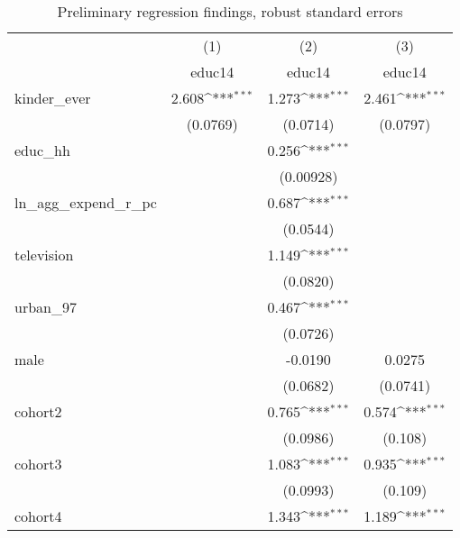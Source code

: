 \begin{table}[htbp]\centering
\def\sym#1{\ifmmode^{#1}\else\(^{#1}\)\fi}
\caption{Preliminary regression findings, robust standard errors}
\begin{tabular}{l*{3}{c}}
\hline\hline
            &\multicolumn{1}{c}{(1)}&\multicolumn{1}{c}{(2)}&\multicolumn{1}{c}{(3)}\\
            &\multicolumn{1}{c}{educ14}&\multicolumn{1}{c}{educ14}&\multicolumn{1}{c}{educ14}\\
\hline
kinder\_ever &       2.608\sym{***}&       1.273\sym{***}&       2.461\sym{***}\\
            &    (0.0769)         &    (0.0714)         &    (0.0797)         \\
[1em]
educ\_hh     &                     &       0.256\sym{***}&                     \\
            &                     &   (0.00928)         &                     \\
[1em]
ln\_agg\_expend\_r\_pc&                     &       0.687\sym{***}&                     \\
            &                     &    (0.0544)         &                     \\
[1em]
television  &                     &       1.149\sym{***}&                     \\
            &                     &    (0.0820)         &                     \\
[1em]
urban\_97    &                     &       0.467\sym{***}&                     \\
            &                     &    (0.0726)         &                     \\
[1em]
male        &                     &     -0.0190         &      0.0275         \\
            &                     &    (0.0682)         &    (0.0741)         \\
[1em]
cohort2     &                     &       0.765\sym{***}&       0.574\sym{***}\\
            &                     &    (0.0986)         &     (0.108)         \\
[1em]
cohort3     &                     &       1.083\sym{***}&       0.935\sym{***}\\
            &                     &    (0.0993)         &     (0.109)         \\
[1em]
cohort4     &                     &       1.343\sym{***}&       1.189\sym{***}\\

\end{tabular}
\end{table}
